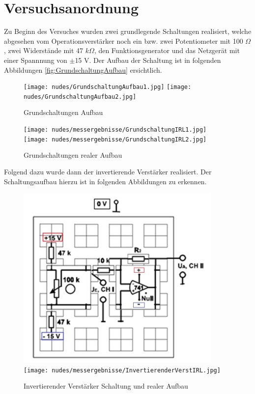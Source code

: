 \documentclass[12pt,a4paper,twoside]{article}
\begin{document}
\section{Versuchsanordnung} %

Zu Beginn des Versuches wurden zwei grundlegende Schaltungen realisiert, welche abgesehen vom Operationsverstärker noch ein bzw. zwei Potentiometer mit 100 $\Omega$, zwei Widerstände mit 47 $k \Omega$, den Funktionsgenerator und das Netzgerät mit einer Spannnung von $\pm$15 V. Der Aufbau der Schaltung ist in folgenden Abbildungen \ref{fig:GrundschaltungAufbau} ersichtlich.

\begin{figure}[H]
    \centering
    \texttt{[image: nudes/GrundschaltungAufbau1.jpg]}
    \texttt{[image: nudes/GrundschaltungAufbau2.jpg]}
    \caption{Grundschaltungen Aufbau \cite{teachcenter2}}
    \label{fig:GrundschaltungenAufbau}
\end{figure}

\begin{figure}[H]
    \centering
    \texttt{[image: nudes/messergebnisse/GrundschaltungIRL1.jpg]}
    \texttt{[image: nudes/messergebnisse/GrundschaltungIRL2.jpg]}
    \caption{Grundschaltungen realer Aufbau}
    \label{fig:GrundschaltungenAufbauIRL}
\end{figure}

\noindent
Folgend dazu wurde dann der invertierende Verstärker realisiert. Der Schaltungsaufbau hierzu ist in folgenden Abbildungen zu erkennen.

\begin{figure}[H]
    \centering
    \includegraphics[width=0.4\linewidth]{nudes/InvertierenderVerstärkerSchaltungAufbau.jpg}
    \texttt{[image: nudes/messergebnisse/InvertierenderVerstIRL.jpg]}
    \caption{Invertierender Verstärker Schaltung und realer Aufbau \cite{teachcenter2}}
    \label{fig:SchaltungInvertierenderVerstärker}
\end{figure}
\end{document}
